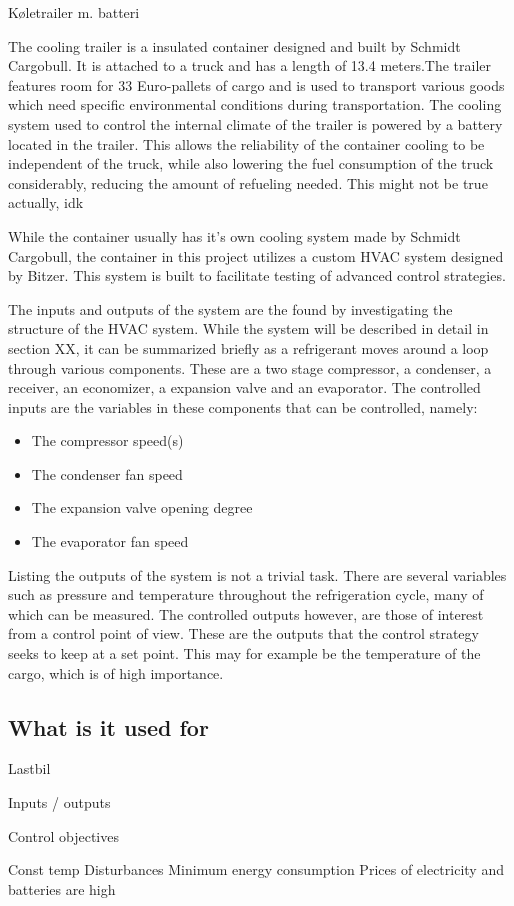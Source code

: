 
Køletrailer m. batteri


The cooling trailer is a insulated container designed and built by Schmidt Cargobull. It is attached to a truck and has a length of 13.4 meters.The trailer features room for 33 Euro-pallets of cargo and is used to transport various goods which need specific environmental conditions during transportation. The cooling system used to control the internal climate of the trailer is powered by a battery located in the trailer. This allows the reliability of the container cooling to be independent of the truck, while also lowering the fuel consumption of the truck considerably, reducing the amount of refueling needed. This might not be true actually, idk

While the container usually has it's own cooling system made by Schmidt Cargobull, the container in this project utilizes a custom HVAC system designed by Bitzer. This system is built to facilitate testing of advanced control strategies.

The inputs and outputs of the system are the found by investigating the structure of the HVAC system. While the system will be described in detail in section XX, it can be summarized briefly as a refrigerant moves around a loop through various components. These are a two stage compressor, a condenser, a receiver, an economizer, a expansion valve and an evaporator. The controlled inputs are the variables in these components that can be controlled, namely:
\begin{itemize}
	\item The compressor speed(s)
	\item The condenser fan speed
	\item The expansion valve opening degree
	\item The evaporator fan speed
\end{itemize}

Listing the outputs of the system is not a trivial task. There are several variables such as pressure and temperature throughout the refrigeration cycle, many of which can be measured. The controlled outputs however, are those of interest from a control point of view. These are the outputs that the control strategy seeks to keep at a set point. This may for example be the temperature of the cargo, which is of high importance.  




\subsection{What is it used for}
	Lastbil
	
	
Inputs / outputs

Control objectives

	Const temp
		Disturbances
	Minimum energy consumption
		Prices of electricity and batteries are high
		
